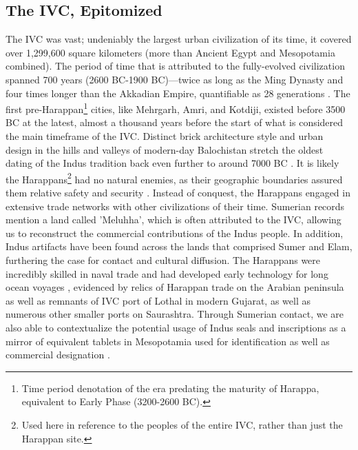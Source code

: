 \documentclass[11pt,a4paper,oneside]{report}
\begin{document}
\subsection{The IVC, Epitomized}
\noindent\hspace{1cm}
The IVC was vast; undeniably the largest urban civilization of its time, it covered over 1,299,600 square kilometers (more than Ancient Egypt and Mesopotamia combined). The period of time that is attributed to the fully-evolved civilization spanned 700 years (2600 BC-1900 BC)—twice as long as the Ming Dynasty and four times longer than the Akkadian Empire, quantifiable as 28 generations \cite{khan_bricks_2013}. The first pre-Harappan\footnote{Time period denotation  of the era predating the maturity of Harappa, equivalent to Early Phase (3200-2600 BC).} cities, like Mehrgarh, Amri, and Kotdiji, existed before 3500 BC at the latest, almost a thousand years before the start of what is considered the main timeframe of the IVC. Distinct brick architecture style and urban design in the hills and valleys of modern-day Balochistan stretch the oldest dating of the Indus tradition back even further to around 7000 BC \cite{khan_bricks_2013, brunswig_radiocarbon_1975}.
It is likely the Harappans\footnote{Used here in reference to the peoples of the entire IVC, rather than just the Harappan site.} had no natural enemies, as their geographic boundaries assured them relative safety and security \cite{mcintosh_peaceful_2001}. Instead of conquest, the Harappans engaged in extensive trade networks with other civilizations of their time. Sumerian records mention a land called 'Meluhha', which is often attributed to the IVC, allowing us to reconstruct the commercial contributions of the Indus people. In addition, Indus artifacts have been found across the lands that comprised Sumer and Elam, furthering the case for contact and cultural diffusion. The Harappans were incredibly skilled in naval trade and had developed early technology for long ocean voyages \cite{lahiri_harappa_1990}, evidenced by relics of Harappan trade on the Arabian peninsula as well as remnants of IVC port of Lothal in modern Gujarat, as well as numerous other smaller ports on Saurashtra. Through Sumerian contact, we are also able to contextualize the potential usage of Indus seals and inscriptions as a mirror of equivalent tablets in Mesopotamia used for identification as well as commercial designation \cite{mukhopadhyay_semantic_2023}.
\end{document}
